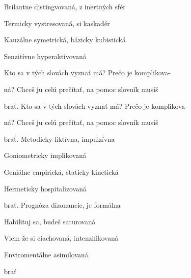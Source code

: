 \begin{song}


\begin{hchordbox}
\end{hchordbox}

\Large

\bigskip


 Brilantne distingvovaná, z inertných sfér \par
{} Termicky vystresovaná, si kaskadér \par
{} Kauzálne symetrická,  bázicky kubistická \par
{} Senzitívne hyperaktivovaná \par

\bigskip

\begin{chorusboxwide}{\Refren}
 Kto sa v tých slovách vyznať má? Prečo je komplikova- \par
{}ná? Chceš ju celú prečítať, na pomoc slovník musíš \par
{}brať. Kto sa v tých slovách vyznať má? Prečo je komplikova- \par
{}ná? Chceš ju celú prečítať, na pomoc slovník musíš \par
\end{chorusboxwide}

\bigskip

brať. Metodicky fiktívna, impulzívna \par
{} Goniometricky implikovaná \par
{} Geniálne empirická,  staticky kinetická \par
{} Hermeticky hospitalizovaná \par

\bigskip

\Refren

\bigskip

brať. Prognóza dizonancie, je formálna \par
{} Habilituj sa, budeš saturovaná \par
{} Viem že si ciachovaná,  intenzifikovaná \par
{} Enviromentálne asimilovaná \par

\bigskip

\Refren

\bigskip

brať

\end{song}
